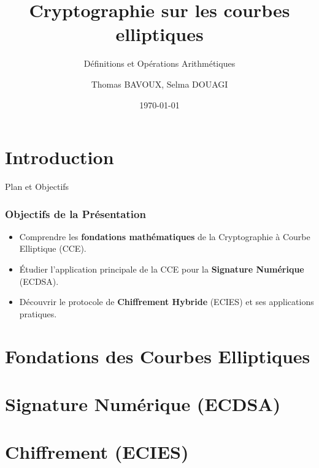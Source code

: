 \documentclass[aspectratio=169]{beamer}
\title{Cryptographie sur les courbes elliptiques}
\subtitle{Définitions et Opérations Arithmétiques}
\author{Thomas BAVOUX, Selma DOUAGI}
\date{\today}
\begin{document}
\begin{frame}
    \titlepage
\end{frame}

\section{Introduction}
\begin{frame}{Plan et Objectifs}
\frametitle{Objectifs de la Présentation}

\begin{itemize}
    \item Comprendre les \textbf{fondations mathématiques} de la Cryptographie à Courbe Elliptique (CCE).
    \item Étudier l'application principale de la CCE pour la \textbf{Signature Numérique} (ECDSA).
    \item Découvrir le protocole de \textbf{Chiffrement Hybride} (ECIES) et ses applications pratiques.
\end{itemize}
\end{frame}

\section{Fondations des Courbes Elliptiques}


\section{Signature Numérique (ECDSA)}


\section{Chiffrement (ECIES)}


\end{document}

